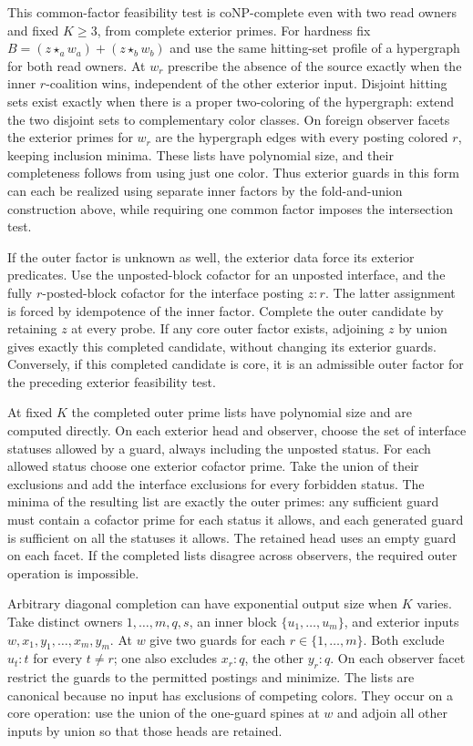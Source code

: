 This common-factor feasibility test is coNP-complete even with two
read owners and fixed $K\geq3$, from complete exterior primes.
For hardness fix $B=(z\star_a w_a)+(z\star_b w_b)$ and use the same
hitting-set profile of a hypergraph for both read owners. At $w_r$
prescribe the absence of the source exactly when the inner
$r$-coalition wins, independent of the other exterior input. Disjoint hitting sets exist exactly
when there is a proper two-coloring of the hypergraph: extend the
two disjoint sets to complementary color classes. On foreign
observer facets the exterior primes for $w_r$ are the hypergraph
edges with every posting colored $r$, keeping inclusion minima.
These lists have polynomial size, and their completeness follows
from using just one color. Thus exterior guards in this form can
each be realized using separate inner factors by the fold-and-union
construction above, while requiring one common factor imposes the
intersection test.

If the outer factor is unknown as well, the exterior data force
its exterior predicates. Use the unposted-block cofactor for an
unposted interface, and the fully $r$-posted-block cofactor for
the interface posting $z:r$. The latter assignment is forced by
idempotence of the inner factor. Complete the outer candidate by
retaining $z$ at every probe. If any core outer factor exists,
adjoining $z$ by union gives exactly this completed candidate,
without changing its exterior guards. Conversely, if this
completed candidate is core, it is an admissible outer factor
for the preceding exterior feasibility test.

At fixed $K$ the completed outer prime lists have polynomial size
and are computed directly. On each exterior head and observer,
choose the set of interface statuses allowed by a guard, always
including the unposted status. For each allowed status choose
one exterior cofactor prime. Take the union of their exclusions
and add the interface exclusions for every forbidden status.
The minima of the resulting list are exactly the outer primes:
any sufficient guard must contain a cofactor prime for each
status it allows, and each generated guard is sufficient on
all the statuses it allows. The retained head uses an empty
guard on each facet. If the completed lists disagree across
observers, the required outer operation is impossible.

Arbitrary diagonal completion can have exponential output size
when $K$ varies. Take
distinct owners $1,\ldots,m,q,s$, an inner block
$\{u_1,\ldots,u_m\}$, and exterior inputs $w,x_1,y_1,\ldots,x_m,y_m$.
At $w$ give two guards for each $r\in\{1,\ldots,m\}$. Both exclude
$u_t:t$ for every $t\ne r$; one also excludes $x_r:q$, the other
$y_r:q$. On each observer facet restrict the guards to the permitted
postings and minimize. The lists are canonical because no input
has exclusions of competing colors. They occur on a core operation:
use the union of the one-guard spines at $w$ and adjoin all other
inputs by union so that those heads are retained.

